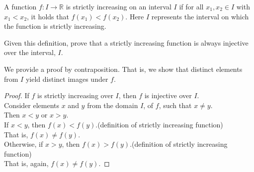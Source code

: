 \documentclass[a4paper]{exam}
\theoremstyle{definition}
\newcommand\R{\ensuremath{\mathbb{R}}}
\begin{document}
\begin{questions}
\question A function \(f: I \rightarrow \R\) is strictly increasing on an interval \(I\) if for all \(x_1, x_2 \in I\) with \(x_1 < x_2\), it holds that \(f(x_1) < f(x_2)\). Here $I$ represents the interval on which the function is strictly increasing.
  
  Given this definition, prove that a strictly increasing function is always injective over the interval, $I$.

  \begin{solution}
    We provide a proof by contraposition. That is, we show that distinct elements from $I$ yield distinct images under $f$.

    \begin{proof}If $f$ is strictly increasing over $I$, then $f$ is injective over $I$.\\
      Consider elements $x$ and $y$ from the domain $I$, of $f$, such that $x\neq y$.\\
      Then $x<y$ or $x>y$.\\
      If $x<y$, then $f(x)<f(y)$.\hfill(definition of strictly increasing function)\\
      That is, $f(x)\neq f(y)$.\\
      Otherwise, if $x>y$, then $f(x)>f(y)$.\hfill(definition of strictly increasing function)\\
      That is, again, $f(x)\neq f(y)$.
    \end{proof}
  \end{solution}
\end{questions}
\end{document}
